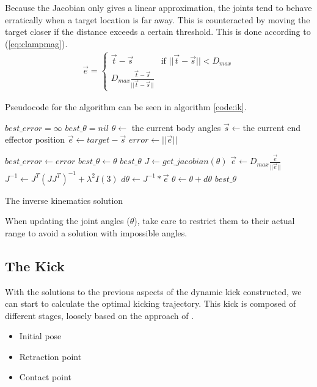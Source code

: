 \documentclass[a4paper]{article}
\begin{document}
Because the Jacobian only gives a linear approximation, the joints
tend to behave erratically when a target location is far away. This is
counteracted by moving the target closer if the distance exceeds a
certain threshold. This is done according to (\ref{eq:clampmag}).
\begin{align}
  \vec{e} = \begin{cases}
    \vec{t} - \vec{s} & \text{if } ||\vec{t} - \vec{s}|| < D_{max} \\
    D_{max} \frac{\vec{t} - \vec{s}}{||\vec{t} - \vec{s}||}
  \end{cases}      \label{eq:clampmag}
\end{align}

Pseudocode for the algorithm can be seen in algorithm \ref{code:ik}.

\begin{algorithm}
  \begin{algorithmic}
      \State $best\_error = \infty$
      \State $best\_\theta = nil$
      \State $\theta \gets$ the current body angles
        \State $\vec{s} \gets $the current end effector position
        \State $\vec{e} \gets target - \vec{s}$
        \State $error \gets ||\vec{e}||$

          \State $best\_error \gets error$
          \State $best\_\theta \gets \theta$
        \EndIf
          \State \Return $best\_\theta$
        \Else
          \State $J \gets get\_jacobian(\theta)$
            \State $\vec{e} \gets D_{max} \frac{\vec{e}}{||\vec{e}||}$
          \EndIf
          \State $J^{-1} \gets J^T (J J^T)^{-1} + \lambda^2 I(3)$
          \State $d\theta \gets J^{-1} * \vec{e}$
          \State $\theta \gets \theta + d\theta$
        \EndIf
      \EndWhile
      \State \Return $best\_\theta$
    \EndFunction
  \end{algorithmic}
  \caption{The inverse kinematics solution}
  \label{code:ik}
\end{algorithm}

When updating the joint angles ($\theta$), take care to restrict them to their
actual range to avoid a solution with impossible angles.

\subsection{The Kick}
\label{sec:kick}
With the solutions to the previous aspects of the dynamic kick constructed, 
we can start to calculate the optimal kicking trajectory. This kick is composed
of different stages, loosely based on the approach of \cite{Xu2010}. 
\begin{itemize}
    \item Initial pose
    \item Retraction point
    \item Contact point
\end{itemize}
\end{document}
